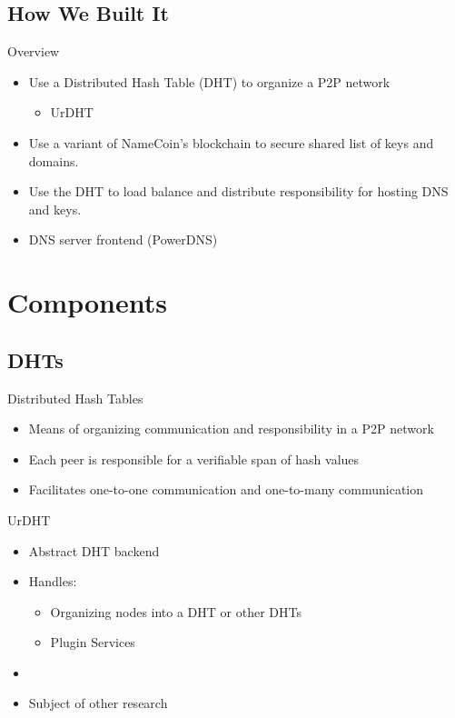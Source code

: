 \documentclass[11pt]{beamer}
\begin{document}
\subsection{How We Built It}

\begin{frame}{Overview}

	\begin{itemize}
	
		\item Use a Distributed Hash Table (DHT) to organize a P2P network
		\begin{itemize}
			\item  UrDHT
		\end{itemize}
		\item Use a variant of NameCoin's blockchain to secure shared list of keys and domains.
		\item Use the DHT to load balance and distribute responsibility for hosting DNS
		and keys.
		\item DNS server frontend (PowerDNS)
	\end{itemize}
\end{frame}


\section{Components}

\subsection{DHTs}
\begin{frame}{Distributed Hash Tables}

	\begin{itemize}
		\item  Means of organizing communication and responsibility in a P2P network
		\item  Each peer is responsible for a verifiable span of hash values
		\item  Facilitates one-to-one communication and one-to-many communication
	\end{itemize}

\end{frame}

\begin{frame}{UrDHT}
	\begin{itemize}
		\item Abstract DHT backend
		\item Handles:
		\begin{itemize}
			\item Organizing  nodes into a DHT or other DHTs
			\item Plugin Services
		\end{itemize}
		\item 
		\item Subject of other research
	\end{itemize}
\end{frame}
\end{document}
